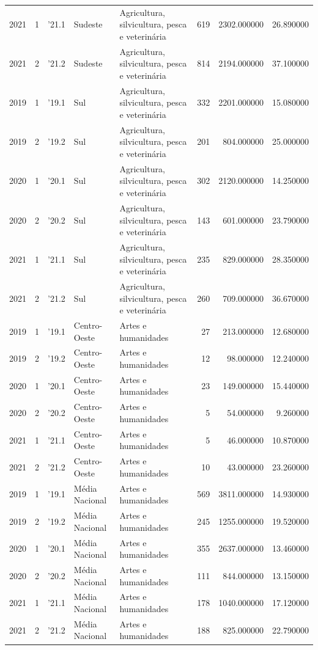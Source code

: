 \begin{longtable}{rrlllrrr}
2021 & 1 & '21.1 & Sudeste & Agricultura, silvicultura, pesca e veterinária & 619 & 2302.000000 & 26.890000 \\
2021 & 2 & '21.2 & Sudeste & Agricultura, silvicultura, pesca e veterinária & 814 & 2194.000000 & 37.100000 \\
2019 & 1 & '19.1 & Sul & Agricultura, silvicultura, pesca e veterinária & 332 & 2201.000000 & 15.080000 \\
2019 & 2 & '19.2 & Sul & Agricultura, silvicultura, pesca e veterinária & 201 & 804.000000 & 25.000000 \\
2020 & 1 & '20.1 & Sul & Agricultura, silvicultura, pesca e veterinária & 302 & 2120.000000 & 14.250000 \\
2020 & 2 & '20.2 & Sul & Agricultura, silvicultura, pesca e veterinária & 143 & 601.000000 & 23.790000 \\
2021 & 1 & '21.1 & Sul & Agricultura, silvicultura, pesca e veterinária & 235 & 829.000000 & 28.350000 \\
2021 & 2 & '21.2 & Sul & Agricultura, silvicultura, pesca e veterinária & 260 & 709.000000 & 36.670000 \\
2019 & 1 & '19.1 & Centro-Oeste & Artes e humanidades & 27 & 213.000000 & 12.680000 \\
2019 & 2 & '19.2 & Centro-Oeste & Artes e humanidades & 12 & 98.000000 & 12.240000 \\
2020 & 1 & '20.1 & Centro-Oeste & Artes e humanidades & 23 & 149.000000 & 15.440000 \\
2020 & 2 & '20.2 & Centro-Oeste & Artes e humanidades & 5 & 54.000000 & 9.260000 \\
2021 & 1 & '21.1 & Centro-Oeste & Artes e humanidades & 5 & 46.000000 & 10.870000 \\
2021 & 2 & '21.2 & Centro-Oeste & Artes e humanidades & 10 & 43.000000 & 23.260000 \\
2019 & 1 & '19.1 & Média Nacional & Artes e humanidades & 569 & 3811.000000 & 14.930000 \\
2019 & 2 & '19.2 & Média Nacional & Artes e humanidades & 245 & 1255.000000 & 19.520000 \\
2020 & 1 & '20.1 & Média Nacional & Artes e humanidades & 355 & 2637.000000 & 13.460000 \\
2020 & 2 & '20.2 & Média Nacional & Artes e humanidades & 111 & 844.000000 & 13.150000 \\
2021 & 1 & '21.1 & Média Nacional & Artes e humanidades & 178 & 1040.000000 & 17.120000 \\
2021 & 2 & '21.2 & Média Nacional & Artes e humanidades & 188 & 825.000000 & 22.790000 \\

\end{longtable}
